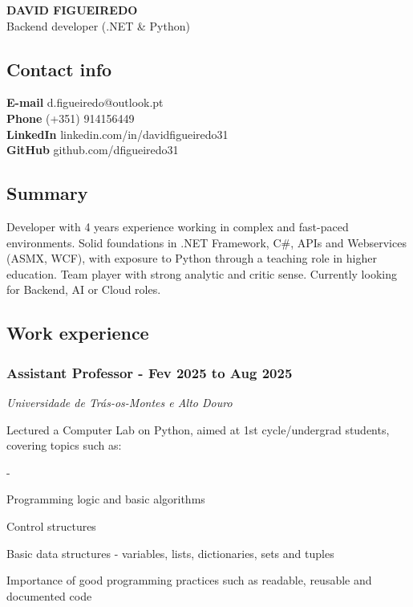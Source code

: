 \documentclass[a4paper,11pt]{article}
\renewenvironment{itemize}{
  \begin{list}
    {-}
    {
      \setlength{\leftmargin}{1em}
      \setlength{\itemsep}{-0.3em}
      \setlength{\parskip}{0em}
      \setlength{\parsep}{0em}
    }
}{
  \end{list}
}
\begin{document}
  \begin{center}
    \MakeUppercase{\huge \textbf{David Figueiredo}}\\Backend developer
(.NET \& Python)
  \end{center}

    \subsection{Contact info}\label{contact-info}

    \textbf{E-mail} d.figueiredo@outlook.pt\\
    \textbf{Phone} (+351) 914156449\\
    \textbf{LinkedIn} linkedin.com/in/davidfigueiredo31\\
    \textbf{GitHub} github.com/dfigueiredo31

    \subsection{Summary}\label{summary}

    Developer with 4 years experience working in complex and fast-paced
    environments. Solid foundations in .NET Framework, C\#, APIs and
    Webservices (ASMX, WCF), with exposure to Python through a teaching
    role in higher education. Team player with strong analytic and
    critic sense. Currently looking for Backend, AI or Cloud roles.

    \subsection{Work experience}\label{work-experience}

    \subsubsection{Assistant Professor - Fev 2025 to Aug
    2025}\label{assistant-professor---fev-2025-to-aug-2025}

    \emph{Universidade de Trás-os-Montes e Alto Douro}

    Lectured a Computer Lab on Python, aimed at 1st cycle/undergrad
    students, covering topics such as:

    \begin{itemize}
    \item
      Programming logic and basic algorithms
    \item
      Control structures
    \item
      Basic data structures - variables, lists, dictionaries, sets and
      tuples
    \item
      Importance of good programming practices such as readable,
      reusable and documented code
    \end{itemize}
\end{document}
